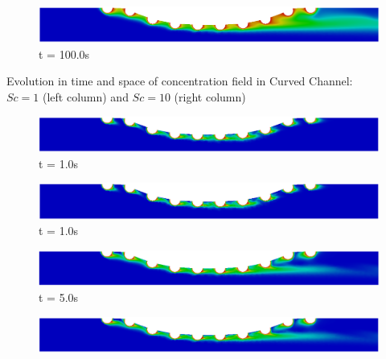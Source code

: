 \begin{frame}
\begin{figure}
\begin{minipage}{.50\linewidth}
     \end{minipage}%
     \begin{minipage}{.50\linewidth}
      \centering
      \includegraphics[scale=0.12]{images/conc10_CurvedStrut8.png}\\
      \tiny t = 100.0s
     \end{minipage}
\end{figure}
\vspace{-0.2cm}
\centering \scriptsize Evolution in time and space of concentration field in Curved Channel:\\
                 $Sc=1$ (left column) and $Sc=10$ (right column)
\vspace{0cm}
\begin{figure}
     \begin{minipage}{.50\linewidth}
      \centering
      \includegraphics[scale=0.12]{images/conc100_CurvedStrut3.png}\\
      \tiny t = 1.0s
     \end{minipage}%
     \begin{minipage}{.50\linewidth}
      \centering
      \includegraphics[scale=0.12]{images/conc1000_CurvedStrut3.png}\\
      \tiny t = 1.0s
     \end{minipage}
     \begin{minipage}{.50\linewidth}
     \medskip
      \centering
      \includegraphics[scale=0.12]{images/conc100_CurvedStrut5.png}\\
      \tiny t = 5.0s
     \end{minipage}%
     \begin{minipage}{.50\linewidth}
     \medskip
      \centering
      \includegraphics[scale=0.12]{images/conc1000_CurvedStrut5.png}\\

\end{minipage}
\end{figure}
\end{frame}
